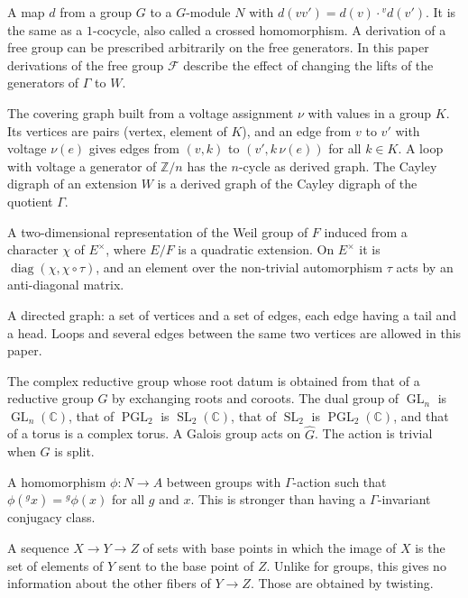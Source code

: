 \documentclass[12pt,letterpaper]{article}
\numberwithin{equation}{section}
\theoremstyle{plain}
\theoremstyle{definition}
\newcommand{\Z}{\mathbb{Z}}
\newcommand{\C}{\mathbb{C}}
\newcommand{\Gh}{\widehat{G}}
\newcommand{\act}[2]{{}^{#1}\!#2}          %
\newcommand{\fr}{\mathcal{F}}             %
\DeclareMathOperator{\GL}{GL}
\DeclareMathOperator{\SL}{SL}
\DeclareMathOperator{\PGL}{PGL}
\DeclareMathOperator{\diag}{diag}
\begin{document}
\begin{description}[itemsep=3pt,leftmargin=1.5em,style=unboxed]
\item[Derivation.] A map $d$ from a group $G$ to a $G$-module $N$ with
$d(vv')=d(v)\cdot\act{v}{d(v')}$. It is the same as a $1$-cocycle, also called
a crossed homomorphism. A derivation of a free group can be prescribed
arbitrarily on the free generators. In this paper derivations of the free
group $\fr$ describe the effect of changing the lifts of the generators
of $\Gamma$ to $W$.

\item[Derived graph.] The covering graph built from a voltage assignment
$\nu$ with values in a group $K$. Its vertices are pairs (vertex, element
of $K$), and an edge from $v$ to $v'$ with voltage $\nu(e)$ gives edges
from $(v,k)$ to $(v',k\,\nu(e))$ for all $k\in K$. A loop with voltage a
generator of $\Z/n$ has the $n$-cycle as derived graph. The Cayley digraph
of an extension $W$ is a derived graph of the Cayley digraph of the
quotient $\Gamma$.

\item[Dihedral parameter.] A two-dimensional representation of the Weil
group of $F$ induced from a character $\chi$ of $E^\times$, where $E/F$ is
a quadratic extension. On $E^\times$ it is $\diag(\chi,\chi\circ\tau)$,
and an element over the non-trivial automorphism $\tau$ acts by an
anti-diagonal matrix.

\item[Digraph.] A directed graph: a set of vertices and a set of edges,
each edge having a tail and a head. Loops and several edges between the
same two vertices are allowed in this paper.

\item[Dual group $\Gh$.] The complex reductive group whose root datum is
obtained from that of a reductive group $G$ by exchanging roots and
coroots. The dual group of $\GL_n$ is $\GL_n(\C)$, that of $\PGL_2$ is
$\SL_2(\C)$, that of $\SL_2$ is $\PGL_2(\C)$, and that of a torus is a
complex torus. A Galois group acts on $\Gh$. The action is trivial when
$G$ is split.

\item[Equivariant homomorphism.] A homomorphism $\phi:N\to A$ between
groups with $\Gamma$-action such that
$\phi(\act{g}{x})=\act{g}{\phi(x)}$ for all $g$ and $x$. This is stronger
than having a $\Gamma$-invariant conjugacy class.

\item[Exact sequence of pointed sets.] A sequence $X\to Y\to Z$ of sets
with base points in which the image of $X$ is the set of elements of $Y$
sent to the base point of $Z$. Unlike for groups, this gives no
information about the other fibers of $Y\to Z$. Those are obtained by
twisting.


\end{description}
\end{document}
